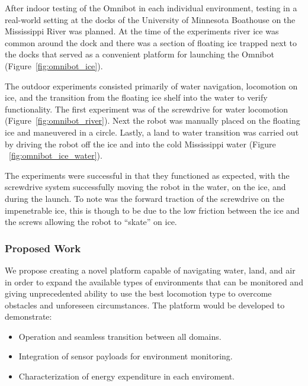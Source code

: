 After indoor testing of the Omnibot in each individual environment, testing in a real-world setting at the docks of the University of Minnesota Boathouse on the Mississippi River was planned. At the time of the experiments river ice was common around the dock and there was a section of floating ice trapped next to the docks that served as a convenient platform for launching the Omnibot (Figure~\ref{fig:omnibot_ice}).  

The outdoor experiments consisted primarily of water navigation, locomotion on ice, and the transition from the floating ice shelf into the water to verify functionality. The first experiment was of the screwdrive for water locomotion (Figure~\ref{fig:omnibot_river}). Next the robot was manually placed on the floating ice and maneuvered in a circle. Lastly, a land to water transition was carried out by driving the robot off the ice and into the cold Mississippi water (Figure ~\ref{fig:omnibot_ice_water}).

The experiments were successful in that they functioned as expected, with the screwdrive system successfully moving the robot in the water, on the ice, and during the launch. To note was the forward traction of the screwdrive on the impenetrable ice, this is though to be due to the low friction between the ice and the screws allowing the robot to ``skate'' on ice.  


\subsubsection{Proposed Work}
\label{omnibot_proposed}

We propose creating a novel platform capable of navigating water, land, and air in order to expand the available types of environments that can be monitored and giving unprecedented ability to use the best locomotion type to overcome obstacles and unforeseen circumstances. The platform would be developed to demonstrate:

\begin{itemize}
  \item Operation and seamless transition between all domains.
  \item Integration of sensor payloads for environment monitoring.
  \item Characterization of energy expenditure in each enviroment.
\end{itemize}



